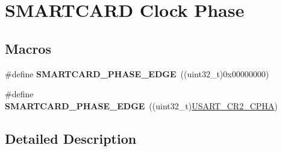 \hypertarget{group___s_m_a_r_t_c_a_r_d___clock___phase}{}\section{S\+M\+A\+R\+T\+C\+A\+RD Clock Phase}
\label{group___s_m_a_r_t_c_a_r_d___clock___phase}
\subsection*{Macros}
\begin{DoxyCompactItemize}
\item 
\#define {\bfseries S\+M\+A\+R\+T\+C\+A\+R\+D\+\_\+\+P\+H\+A\+S\+E\+\_\+E\+D\+GE}~((uint32\+\_\+t)0x00000000)\hypertarget{group___s_m_a_r_t_c_a_r_d___clock___phase_ga6b5dfd540b22b8a6cbd956688d17cfce}{}\label{group___s_m_a_r_t_c_a_r_d___clock___phase_ga6b5dfd540b22b8a6cbd956688d17cfce}

\item 
\#define {\bfseries S\+M\+A\+R\+T\+C\+A\+R\+D\+\_\+\+P\+H\+A\+S\+E\+\_\+E\+D\+GE}~((uint32\+\_\+t)\hyperlink{group___peripheral___registers___bits___definition_ga362976ce813e58310399d113d2cf09cb}{U\+S\+A\+R\+T\+\_\+\+C\+R2\+\_\+\+C\+P\+HA})\hypertarget{group___s_m_a_r_t_c_a_r_d___clock___phase_ga744e424283994e4c92a4db8b247582d6}{}\label{group___s_m_a_r_t_c_a_r_d___clock___phase_ga744e424283994e4c92a4db8b247582d6}

\end{DoxyCompactItemize}


\subsection{Detailed Description}
